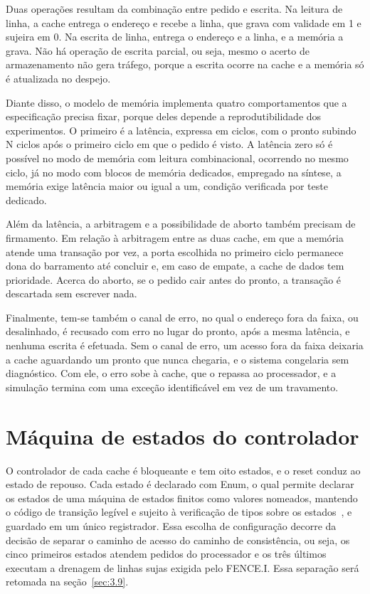 Duas operações resultam da combinação entre pedido e escrita. Na leitura de linha, a cache entrega o endereço e recebe a linha, que grava com validade em 1 e sujeira em 0. Na escrita de linha, entrega o endereço e a linha, e a memória a grava. Não há operação de escrita parcial, ou seja, mesmo o acerto de armazenamento não gera tráfego, porque a escrita ocorre na cache e a memória só é atualizada no despejo.

Diante disso, o modelo de memória implementa quatro comportamentos que a especificação precisa fixar, porque deles depende a reprodutibilidade dos experimentos. O primeiro é a latência, expressa em ciclos, com o pronto subindo N ciclos após o primeiro ciclo em que o pedido é visto. A latência zero só é possível no modo de memória com leitura combinacional, ocorrendo no mesmo ciclo, já no modo com blocos de memória dedicados, empregado na síntese, a memória exige latência maior ou igual a um, condição verificada por teste dedicado.

Além da latência, a arbitragem e a possibilidade de aborto também precisam de firmamento. Em relação à arbitragem entre as duas cache, em que a memória atende uma transação por vez, a porta escolhida no primeiro ciclo permanece dona do barramento até concluir e, em caso de empate, a cache de dados tem prioridade. Acerca do aborto, se o pedido cair antes do pronto, a transação é descartada sem escrever nada.

Finalmente, tem-se também o canal de erro, no qual o endereço fora da faixa, ou desalinhado, é recusado com erro no lugar do pronto, após a mesma latência, e nenhuma escrita é efetuada. Sem o canal de erro, um acesso fora da faixa deixaria a cache aguardando um pronto que nunca chegaria, e o sistema congelaria sem diagnóstico. Com ele, o erro sobe à cache, que o repassa ao processador, e a simulação termina com uma exceção identificável em vez de um travamento.

\section{Máquina de estados do controlador}\label{sec:3.7}

O controlador de cada cache é bloqueante e tem oito estados, e o reset conduz ao estado de repouso. Cada estado é declarado com Enum, o qual permite declarar os estados de uma máquina de estados finitos como valores nomeados, mantendo o código de transição legível e sujeito à verificação de tipos sobre os estados~\cite{schoeberl2025chisel}, e guardado em um único registrador. Essa escolha de configuração decorre da decisão de separar o caminho de acesso do caminho de consistência, ou seja, os cinco primeiros estados atendem pedidos do processador e os três últimos executam a drenagem de linhas sujas exigida pelo FENCE.I. Essa separação será retomada na seção~\ref{sec:3.9}.

